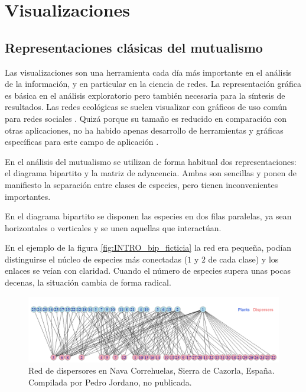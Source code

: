 
\chapter{Visualizaciones} %

\label{VISUALIZACIÓN} %


\section{Representaciones clásicas del mutualismo}

Las visualizaciones son una herramienta cada día más importante en el análisis de la información, y en particular en la ciencia de redes. La representación gráfica es básica en el análisis exploratorio pero también necesaria para la síntesis de resultados. Las redes ecológicas se suelen visualizar con gráficos de uso común para redes sociales \cite{freeman2012social}. Quizá porque su tamaño es reducido en comparación con otras aplicaciones, no ha habido apenas desarrollo de herramientas y gráficas específicas para este campo de aplicación \cite{yoon20043d, kazanci2007econet}.

En el análisis del mutualismo se utilizan de forma habitual dos representaciones: el diagrama bipartito y la matriz de adyacencia. Ambas  son sencillas y ponen de manifiesto la separación entre clases de especies, pero tienen inconvenientes importantes. 

En el diagrama bipartito se disponen las especies en dos filas paralelas, ya sean horizontales o verticales
y se unen aquellas que interactúan.


En el ejemplo de la figura \ref{fig:INTRO_bip_ficticia} la red era pequeña, podían distinguirse el núcleo de especies más conectadas ($1$ y $2$ de cada clase) y los enlaces se veían con claridad. Cuando el número de especies supera unas pocas decenas, la situación cambia de forma radical.

\begin{figure}[h!]
\centering
\includegraphics[scale=0.4]{Figures/VIS_bipartito_SD_020.png}
\caption{Red de dispersores en Nava Correhuelas, Sierra de Cazorla, España. Compilada por Pedro Jordano, no publicada.}
\label{fig:VIS_bipartito_SD_020}
\end{figure}

